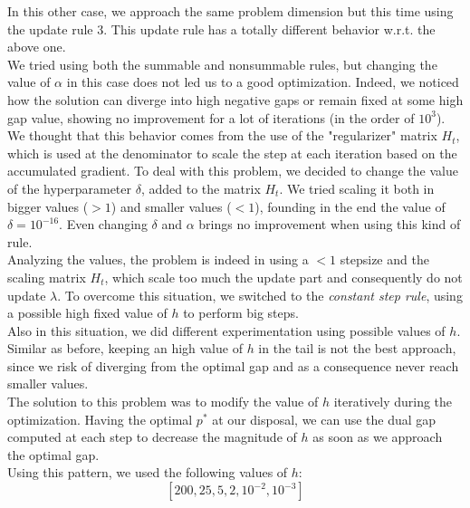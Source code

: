 \documentclass[notitlepage]{article}
\begin{document}
\vspace{1cm}

\begin{changemargin}{3.5cm}{3.5cm}
  In this other case, we approach the same problem dimension but this time using the update rule $3$. This update rule has a totally different behavior w.r.t. the above one.\\ 
  We tried using both the summable and nonsummable rules, but changing the value of $\alpha$ in this case does not led us to a good optimization. Indeed, we noticed how the solution can diverge 
  into high negative gaps or remain fixed at some high gap value, showing no improvement for a lot of iterations (in the order of $10^3$).\\
  We thought that this behavior comes from the use of the "regularizer" matrix $H_t$, which is used at the denominator to scale the step at each iteration based on the accumulated gradient. To deal with 
  this problem, we decided to change the value of the hyperparameter $\delta$, added to the matrix $H_t$. We tried scaling it both in bigger values ($> 1$) and smaller values ($< 1$), founding in the 
  end the value of $\delta = 10^{-16}$. Even changing $\delta$ and $\alpha$ brings no improvement when using this kind of rule.\\
  Analyzing the values, the problem is indeed in using a $< 1$ stepsize and the scaling matrix $H_t$, which scale too much the update part and consequently do not update $\lambda$. To overcome 
  this situation, we switched to the {\itshape constant step rule}, using a possible high fixed value of $h$ to perform big steps.\\
  Also in this situation, we did different experimentation using possible values of $h$.\\
  Similar as before, keeping an high value of $h$ in the tail is not the best approach, since we risk of diverging from the optimal gap and as a consequence never reach smaller values.\\
  The solution to this problem was to modify the value of $h$ iteratively during the optimization. Having the optimal $p^*$ at our disposal, we can use the dual gap computed at each step to decrease the 
  magnitude of $h$ as soon as we approach the optimal gap.\\
  Using this pattern, we used the following values of $h$:
  \[ \left[ 200, 25, 5, 2, 10^{-2}, 10^{-3} \right] \]
\end{changemargin}

\vfill
\hspace{0pt}
\end{document}

